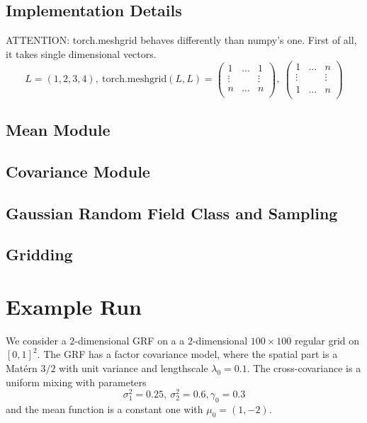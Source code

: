 \documentclass[a4paper,10pt]{article}
\begin{document}
\subsection{Implementation Details}
ATTENTION: torch.meshgrid behaves differently than numpy's one.
First of all, it takes single dimensional vectors.
\[
    L=(1,2,3,4),~ \textrm{torch.meshgrid}(L,L)=
    \begin{pmatrix}
        1 & \dots & 1\\
        \vdots &  & \vdots \\
        n & \dots & n\\
    \end{pmatrix}
    ,~ 
    \begin{pmatrix}
        1 & \dots & n\\
        \vdots &  & \vdots \\
        1 & \dots & n\\
    \end{pmatrix}
\]

\subsection{Mean Module}
\subsection{Covariance Module}
\subsection{Gaussian Random Field Class and Sampling}
\subsection{Gridding}

\newpage

\section{Example Run}
We consider a $2$-dimensional GRF on a a $2$-dimensional $100\times 100$ regular grid on
$[0,1]^2$. The GRF has a factor covariance model, where the spatial part is a
Mat\'{e}rn $3/2$ with unit variance and lengthscale $\lambda_0 = 0.1$. The
cross-covariance is a uniform mixing with parameters
\[
    \sigma_1^2 = 0.25,~\sigma_2^2 = 0.6, \gamma_0 = 0.3
\]
and the mean function is a constant one with $\mu_0=(1, -2)$.
\medskip
\end{document}

